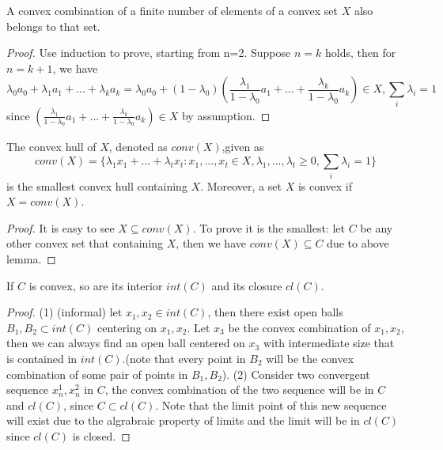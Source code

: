 \begin{refsection}
\begin{lemma}
\cite[44]{bertsimas1997introduction}
A convex combination of a finite number of elements of a convex set $X$ also belongs to that set. 
\end{lemma}
\begin{proof} 
Use induction to prove, starting from n=2. Suppose $n=k$ holds, then for $n=k+1$, we have
$$\lambda_0 a_0 + \lambda_1 a_1 + ... + \lambda_k a_k = \lambda_0 a_0 + (1-\lambda_0)(\frac{\lambda_1}{1-\lambda_0}a_1 + ... + \frac{\lambda_k}{1-\lambda_0}a_k) \in X,\sum_i\lambda_i=1$$
since $(\frac{\lambda_1}{1-\lambda_0}a_1 + ... + \frac{\lambda_k}{1-\lambda_0}a_k) \in X$ by assumption.
\end{proof}
 
\begin{theorem}
The convex hull of $X$, denoted as $conv(X)$,given as
$$conv(X) = \{\lambda_1 x_1 + ... + \lambda_t x_t: x_1,...,x_t\in X,\lambda_1,...,\lambda_t \geq 0, \sum_i \lambda_i = 1\} $$
is the smallest convex hull containing $X$. Moreover, a set $X$ is convex if $X = conv(X)$. 
\end{theorem}
\begin{proof}
It is easy to see $X\subseteq conv(X)$. To prove it is the smallest: let $C$ be any other convex set that containing $X$, then we have $conv(X) \subseteq C$ due to above lemma.
\end{proof}


\begin{lemma}\cite[94]{hiriart2013convex}
If $C$ is convex, so are its interior $int(C)$ and its closure $cl(C)$.		
\end{lemma} 
\begin{proof}
(1) (informal) let $x_1,x_2\in int(C)$, then there exist open balls  $B_1,B_2 \subset int(C)$ centering on $x_1,x_2$. Let $x_3$ be the convex combination of $x_1,x_2$, then we can always find an open ball centered on $x_3$ with intermediate size that is contained in $int(C)$.(note that every point in $B_2$ will be the convex combination of some pair of points in $B_1,B_2$). (2) Consider two convergent sequence $x^1_n,x^2_n$ in $C$, the convex combination of the two sequence will be in $C$ and $cl(C)$, since $C\subset cl(C)$. Note that the limit point of this new sequence will exist due to the algrabraic property of limits and the limit will be in $cl(C)$ since $cl(C)$ is closed.   
\end{proof}



\end{refsection}
